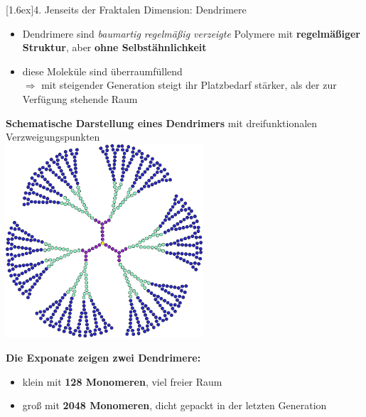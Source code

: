 \documentclass[final]{beamer}
\newlength{\columnheight}
\newlength{\marginw}
\newlength{\tw}
\newlength{\colw}
\newenvironment{myTwoColPoster}{%
  \begin{minipage}[t]{\textwidth}%
    \hspace*{\marginw}%
    \hspace*{9.5bp}%
    \begin{minipage}[t]{\tw}}%
  {\end{minipage}%
   \hspace*{\marginw}%
   \end{minipage}}
\newenvironment{myCol}%
    {\begin{minipage}[t][\columnheight][t]{\colw}}%
    {\end{minipage}}
\newenvironment{textblock}[1]%
    {\begin{block}{\rule[-0.6ex]{0pt}{2.4ex}\raisebox{-0.25ex}[1.6ex]{#1}}%
     \vspace*{5mm}}%
    {\vspace*{5mm}\end{block}}
\begin{document}
\begin{frame}[t]{}
\begin{myTwoColPoster}
\begin{myCol}
  \begin{textblock}{4. Jenseits der Fraktalen Dimension: Dendrimere}
    \begin{itemize}\setlength\itemsep{1.4em}\large
      \item Dendrimere sind \textit{baumartig regelmäßig verzeigte} Polymere mit \textbf{regelmäßiger Struktur}, aber \textbf{ohne Selbstähnlichkeit}
      \item diese Moleküle sind \textcolor{IPForange}{überraumfüllend}\\
      $\Rightarrow$ mit steigender Generation steigt ihr Platzbedarf stärker, als der zur Verfügung stehende Raum
    \end{itemize}
    \begin{center}
      \textbf{Schematische Darstellung eines Dendrimers} mit dreifunktionalen Verzweigungspunkten\\[2cm]
      \includegraphics[width=0.55\textwidth]{fig/Dendrimer}
    \end{center}
    \begin{minipage}[c]{0.8\textwidth}
      \begin{center}\large
        \textbf{\textcolor{IPForange}{\Large Die Exponate zeigen zwei Dendrimere:}}
          \begin{itemize}\large
            \item klein mit \textbf{128 Monomeren}, viel freier Raum
            \item groß mit \textbf{2048 Monomeren}, dicht gepackt in der letzten Generation
          \end{itemize}

\end{center}
\end{minipage}
\end{textblock}
\end{myCol}
\end{myTwoColPoster}
\end{frame}
\end{document}

